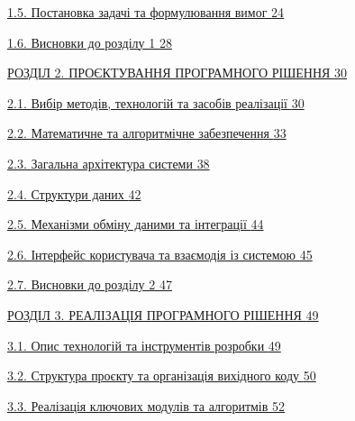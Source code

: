 \documentclass[
]{article}
\begin{document}
\hyperref[X124bb00a71ff7da6d40a6aa8e0ae644d11036d1]{1.5. Постановка
задачі та формулювання вимог
\hyperref[X124bb00a71ff7da6d40a6aa8e0ae644d11036d1]{24}}

\hyperref[X075676d46328bd1f3c167fb2e80b0be216d8f0b]{1.6. Висновки до
розділу 1 \hyperref[X075676d46328bd1f3c167fb2e80b0be216d8f0b]{28}}

\hyperref[_Toc230737385]{РОЗДІЛ 2. ПРОЄКТУВАННЯ ПРОГРАМНОГО РІШЕННЯ
\hyperref[_Toc230737385]{30}}

\hyperref[X1a4d34ad0a12769944c99849904512a7f903224]{2.1. Вибір методів,
технологій та засобів реалізації
\hyperref[X1a4d34ad0a12769944c99849904512a7f903224]{30}}

\hyperref[Xe17a367fa0386aee11bbb4389e0e3ba247fd242]{2.2. Математичне та
алгоритмічне забезпечення
\hyperref[Xe17a367fa0386aee11bbb4389e0e3ba247fd242]{33}}

\hyperref[X8971522f2fc6036ff7f6d6d494a0986f56fee46]{2.3. Загальна
архітектура системи
\hyperref[X8971522f2fc6036ff7f6d6d494a0986f56fee46]{38}}

\hyperref[X1a8106e9c6b1210e5d64318a8773dae790c589d]{2.4. Структури даних
\hyperref[X1a8106e9c6b1210e5d64318a8773dae790c589d]{42}}

\hyperref[Xcd238668ad118f5c941097fa2a256159b3b67a3]{2.5. Механізми
обміну даними та інтеграції
\hyperref[Xcd238668ad118f5c941097fa2a256159b3b67a3]{44}}

\hyperref[X7bbc68d42b10b5c417bba592a2604c867cb2c07]{2.6. Інтерфейс
користувача та взаємодія із системою
\hyperref[X7bbc68d42b10b5c417bba592a2604c867cb2c07]{45}}

\hyperref[X8bc0d69109dea8c0791268fdcf3be0892611a6e]{2.7. Висновки до
розділу 2 \hyperref[X8bc0d69109dea8c0791268fdcf3be0892611a6e]{47}}

\hyperref[Xb318da8362366e318c175a774743ed9d944e7a3]{РОЗДІЛ 3. РЕАЛІЗАЦІЯ
ПРОГРАМНОГО РІШЕННЯ
\hyperref[Xb318da8362366e318c175a774743ed9d944e7a3]{49}}

\hyperref[X730c05323598ba45792da5fe42961130cedb25e]{3.1. Опис технологій
та інструментів розробки
\hyperref[X730c05323598ba45792da5fe42961130cedb25e]{49}}

\hyperref[X167ffd08ffc49c19e5d17ce877b0967d41b68f7]{3.2. Структура
проєкту та організація вихідного коду
\hyperref[X167ffd08ffc49c19e5d17ce877b0967d41b68f7]{50}}

\hyperref[X93404be9f391802071cdb56c883309addb4749a]{3.3. Реалізація
ключових модулів та алгоритмів
\hyperref[X93404be9f391802071cdb56c883309addb4749a]{52}}
\end{document}
